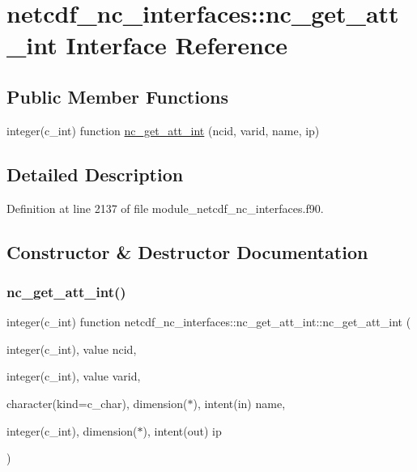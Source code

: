 \hypertarget{interfacenetcdf__nc__interfaces_1_1nc__get__att__int}{}\section{netcdf\+\_\+nc\+\_\+interfaces\+:\+:nc\+\_\+get\+\_\+att\+\_\+int Interface Reference}
\label{interfacenetcdf__nc__interfaces_1_1nc__get__att__int}
\subsection*{Public Member Functions}
\begin{DoxyCompactItemize}
\item 
integer(c\+\_\+int) function \hyperlink{interfacenetcdf__nc__interfaces_1_1nc__get__att__int_a459696fcd94b875172ef57eca2cac84b}{nc\+\_\+get\+\_\+att\+\_\+int} (ncid, varid, name, ip)
\end{DoxyCompactItemize}


\subsection{Detailed Description}


Definition at line 2137 of file module\+\_\+netcdf\+\_\+nc\+\_\+interfaces.\+f90.



\subsection{Constructor \& Destructor Documentation}
\mbox{\label{interfacenetcdf__nc__interfaces_1_1nc__get__att__int_a459696fcd94b875172ef57eca2cac84b}} 
\subsubsection{\texorpdfstring{nc\+\_\+get\+\_\+att\+\_\+int()}{nc\_get\_att\_int()}}
{\footnotesize\ttfamily integer(c\+\_\+int) function netcdf\+\_\+nc\+\_\+interfaces\+::nc\+\_\+get\+\_\+att\+\_\+int\+::nc\+\_\+get\+\_\+att\+\_\+int (\begin{DoxyParamCaption}\item[{integer(c\+\_\+int), value}]{ncid,  }\item[{integer(c\+\_\+int), value}]{varid,  }\item[{character(kind=c\+\_\+char), dimension($\ast$), intent(in)}]{name,  }\item[{integer(c\+\_\+int), dimension($\ast$), intent(out)}]{ip }\end{DoxyParamCaption})}



